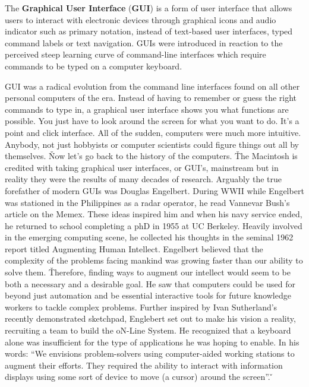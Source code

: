 The \textbf{Graphical User Interface} (\textbf{GUI}) is a form of user interface that allows users to interact with
electronic devices through graphical icons and audio indicator such as primary notation, instead of text-based user
interfaces, typed command labels or text navigation. GUIs were introduced in reaction to the perceived steep learning
curve of command-line interfaces which require commands to be typed on a computer keyboard.
\ed

GUI was a radical evolution from the command line interfaces found on all other personal computers of the era.
Instead of having to remember or guess the right commands to type in, a graphical user interface shows you what
functions are possible. You just have to look around the screen for what you want to do. It's a point and click
interface. All of the sudden, computers were much more intuitive. Anybody, not just hobbyists or computer scientists
could figure things out all by themselves. \v

Now let's go back to the history of the computers. \v

The Macintosh is credited with taking graphical user interfaces, or GUI's, mainstream but in reality they were the
results of many decades of research. Arguably the true forefather of modern GUIs was Douglas Engelbert. During WWII
while Engelbert was stationed in the Philippines as a radar operator, he read Vannevar Bush's article on the Memex.
These ideas inspired him and when his navy service ended, he returned to school completing a phD in 1955 at UC
Berkeley. Heavily involved in the emerging computing scene, he collected his thoughts in the seminal 1962 report
titled Augmenting Human Intellect. Engelbert believed that the complexity of the problems facing mankind was growing
faster than our ability to solve them. \v

Therefore, finding ways to augment our intellect would seem to be both a necessary and a desirable goal. He saw that
computers could be used for beyond just automation and be essential interactive tools for future knowledge workers to
tackle complex problems. Further inspired by Ivan Sutherland's recently demonstrated sketchpad, Englebert set out to
make his vision a reality, recruiting a team to build the oN-Line System. He recognized that a keyboard alone was
insufficient for the type of applications he was hoping to enable. In his words: ``We envisions problem-solvers using
computer-aided working stations to augment their efforts. They required the ability to interact with information
displays using some sort of device to move (a cursor) around the screen''. \v

